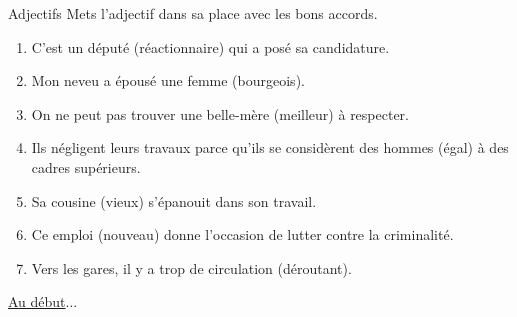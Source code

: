 \begin{frame}{Adjectifs}
  \footnotesize
  Mets l'adjectif dans sa place avec les bons accords.
  \begin{enumerate}
    \item C'est un \funderline[2cm]{} député  (réactionnaire) qui a posé sa candidature.
    \item Mon neveu a épousé une \funderline[2cm]{} femme  (bourgeois).
    \item On ne peut pas trouver une  belle-mère \funderline[2cm]{} (meilleur) à respecter.
    \item Ils négligent leurs travaux parce qu'ils se considèrent des \funderline[2cm]{} hommes  (égal) à des cadres supérieurs.
    \item Sa  cousine \funderline[2cm]{} (vieux) s'épanouit dans son travail.
    \item Ce  emploi \funderline[2cm]{} (nouveau) donne l'occasion de lutter contre la criminalité.
    \item Vers les gares, il y a trop de \funderline[2cm]{} circulation  (déroutant).
  \end{enumerate}
  \raggedleft\raggedleft\hyperlink{début}{Au début}...
\end{frame}